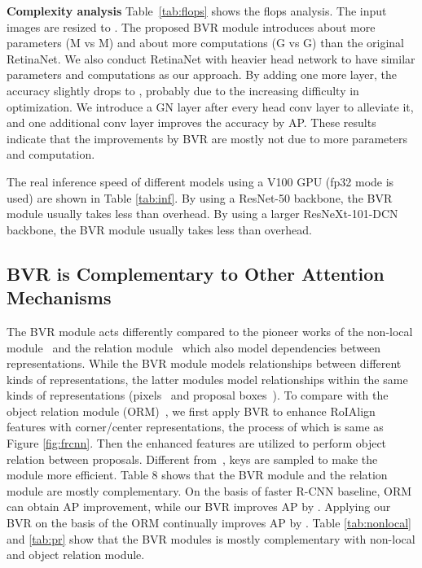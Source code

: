\documentclass{article}
\begin{document}
{\noindent \textbf{Complexity analysis}}
Table~\ref{tab:flops} shows the flops analysis. The input images are resized to . The proposed BVR module introduces about  more parameters (M vs M) and about  more computations (G vs G) than the original RetinaNet. We also conduct RetinaNet with heavier head network to have similar parameters and computations as our approach. By adding one more layer, the accuracy slightly drops to , probably due to the increasing difficulty in optimization. We introduce a GN layer after every head conv layer to alleviate it, and one additional conv layer improves the accuracy by  AP. These results indicate that the improvements by BVR are mostly not due to more parameters and computation.

The real inference speed of different models using a V100 GPU (fp32 mode is used) are shown in Table \ref{tab:inf}. By using a ResNet-50 backbone, the BVR module usually takes less than  overhead. By using a larger ResNeXt-101-DCN backbone, the BVR module usually takes less than  overhead.

\subsection{BVR is Complementary to Other Attention Mechanisms}
The BVR module acts differently compared to the pioneer works of the non-local module~\cite{DBLP:conf/cvpr/0004GGH18} and the relation module~\cite{hu2018relation} which also model dependencies between representations. While the BVR module models relationships between different kinds of representations, the latter modules model relationships within the same kinds of representations (pixels~\cite{DBLP:conf/cvpr/0004GGH18} and proposal boxes~\cite{hu2018relation}). To compare with the object relation module (ORM)~\cite{hu2018relation}, we first apply BVR to enhance RoIAlign features with corner/center representations, the process of which is same as Figure \ref{fig:frcnn}. Then the enhanced features are utilized to perform object relation between proposals. Different from~\cite{hu2018relation}, keys are sampled to make the module more efficient. Table 8 shows that the BVR module and the relation module are mostly complementary. On the basis of faster R-CNN baseline, ORM can obtain  AP improvement, while our BVR improves AP by . Applying our BVR on the basis of the ORM continually improves AP by . Table \ref{tab:nonlocal} and \ref{tab:pr} show that the BVR modules is mostly complementary with non-local and object relation module.
\end{document}
